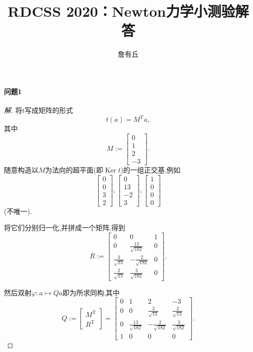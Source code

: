 \documentclass{article}
\title{RDCSS 2020：Newton力学小测验解答}
\author{詹有丘}
\newenvironment{solution}{\renewcommand\qedsymbol{$\blacksquare$}\begin{proof}[解]}{\end{proof}}
\newcommand{\nstars}[1]{\multido{}{#1}{$\star$}}
\begin{document}
\maketitle

\paragraph{问题1}\nstars{4}

\begin{solution}

将$t$写成矩阵的形式
$$t\left(a\right)=M^{\mathrm T}a,$$
其中
$$M:=\left[\begin{matrix}0\\1\\2\\-3\end{matrix}\right].$$
随意构造以$M$为法向的超平面(即$\operatorname{Ker}t$)的一组正交基,例如
$$\left[\begin{matrix}0\\0\\3\\2\end{matrix}\right],
\left[\begin{matrix}0\\13\\-2\\3\end{matrix}\right],
\left[\begin{matrix}1\\0\\0\\0\end{matrix}\right]$$
(不唯一).

将它们分别归一化,并拼成一个矩阵,得到
$$R:=\left[\begin{matrix}0&0&1\\0&\frac{13}{\sqrt{182}}&0\\\frac3{\sqrt{13}}&-\frac2{\sqrt{182}}&0\\\frac2{\sqrt{13}}&\frac3{\sqrt{182}}&0\end{matrix}\right].$$

然后双射$\varphi:a\mapsto Qa$即为所求同构,其中
$$Q:=\left[\begin{matrix}M^{\mathrm T}\\R^{\mathrm T}\end{matrix}\right]=\left[\begin{matrix}0&1&2&-3\\0&0&\frac3{\sqrt{13}}&\frac2{\sqrt{13}}\\0&\frac{13}{\sqrt{182}}&-\frac2{\sqrt{182}}&\frac3{\sqrt{182}}\\1&0&0&0\end{matrix}\right].$$

\end{solution}
\end{document}
